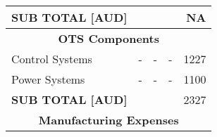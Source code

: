 \begin{table}[h]
{\begin{tabular}{|l|l|l|l|r|}
\textbf{SUB TOTAL {[}AUD{]}}                                 & \multicolumn{4}{r|}{NA}                                                                                                                                   \\ \hline
\multicolumn{5}{|c|}{\textbf{OTS Components}}                                                                                                                                                                  \\ \hline
\multirow{4}{*}{Control Systems}                   & \multirow{4}{*}{-}                 & \multirow{4}{*}{-}                   & \multirow{4}{*}{-}            & \multirow{4}{*}{1227}                         \\
                                                   &                                    &                                      &                               &                                               \\
                                                   &                                    &                                      &                               &                                               \\
                                                   &                                    &                                      &                               &                                               \\ \hline
\multirow{3}{*}{Power Systems}                     & \multirow{3}{*}{-}                 & \multirow{3}{*}{-}                   & \multirow{3}{*}{-}            & \multirow{3}{*}{1100}                         \\
                                                   &                                    &                                      &                               &                                               \\
                                                   &                                    &                                      &                               &                                               \\ \hline
\textbf{SUB TOTAL {[}AUD{]}}                                 & \multicolumn{4}{r|}{2327}                                                                                                                                 \\ \hline
\multicolumn{5}{|c|}{\textbf{Manufacturing Expenses}}                                                                                                                                                          \\ \hline

\end{tabular}}
\end{table}
